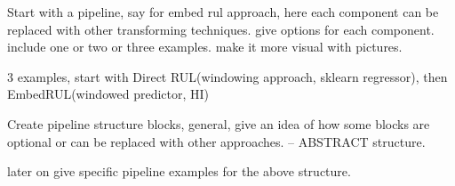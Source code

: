 \documentclass[11pt]{meetingmins} %
\begin{document}
\begin{hiddensubitems}
    \item Start with a pipeline, say for embed rul approach, here each component can be replaced with other transforming techniques. give options for each component. include one or two or three examples. make it more visual with pictures.
    \item 3 examples, start with Direct RUL(windowing approach, sklearn regressor), then EmbedRUL(windowed predictor, HI)
    \item Create pipeline structure blocks, general, give an idea of how some blocks are optional or can be replaced with other approaches. -- ABSTRACT structure.
    \item later on give specific pipeline examples for the above structure.
\end{hiddensubitems}
\end{document}
